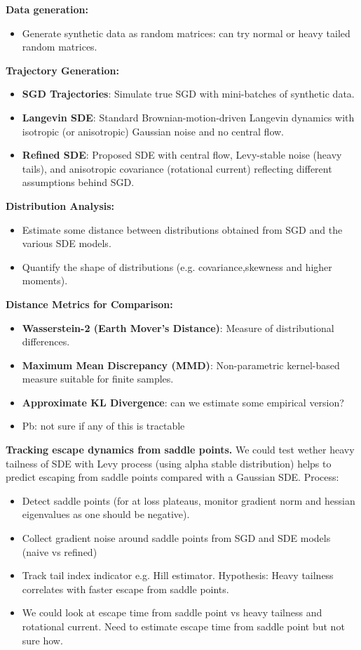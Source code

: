 \documentclass[11pt]{article}
\begin{document}
\textbf{Data generation:}
\begin{itemize}
\item Generate synthetic data as random matrices: can try normal or heavy tailed random matrices.
\end{itemize}
\textbf{Trajectory Generation:}
\begin{itemize}
\item \textbf{SGD Trajectories}: Simulate true SGD with mini-batches of synthetic data.
\item \textbf{Langevin SDE}: Standard Brownian-motion-driven Langevin dynamics with isotropic (or anisotropic) Gaussian noise and no central flow.
\item \textbf{Refined SDE}: Proposed SDE with central flow, Levy-stable noise (heavy tails), and anisotropic covariance (rotational current) reflecting different assumptions behind SGD.
\end{itemize}
\textbf{Distribution Analysis:}
\begin{itemize}
\item Estimate some distance between distributions obtained from SGD and the various SDE models.
\item Quantify the shape of distributions (e.g. covariance,skewness and higher moments).
\end{itemize}
\textbf{Distance Metrics for Comparison:}
\begin{itemize}
\item \textbf{Wasserstein-2 (Earth Mover’s Distance)}: Measure of distributional differences.
\item \textbf{Maximum Mean Discrepancy (MMD)}: Non-parametric kernel-based measure suitable for finite samples.
\item \textbf{Approximate KL Divergence}: can we estimate some empirical version?
\item Pb: not sure if any of this is tractable
\end{itemize}

\textbf{Tracking escape dynamics from saddle points.}
We could test wether heavy tailness of SDE with Levy process (using alpha stable distribution) helps to predict escaping from saddle points compared with a Gaussian SDE.
Process:
\begin{itemize}
    \item Detect saddle points (for at loss plateaus, monitor gradient norm and hessian eigenvalues as one should be negative).
    \item Collect gradient noise around saddle points from SGD and SDE models (naive vs refined)
    \item Track tail index indicator e.g. Hill estimator. Hypothesis: Heavy tailness correlates with faster escape from saddle points.
    \item We could look at escape time from saddle point vs heavy tailness and rotational current. Need to estimate escape time from saddle point but not sure how.
\end{itemize}
\end{document}
